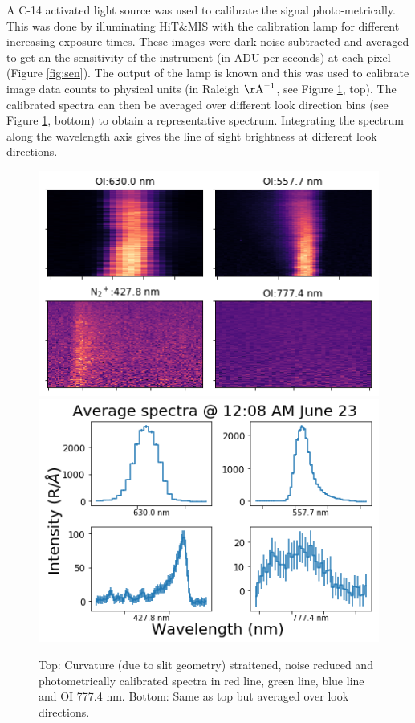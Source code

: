 \documentclass[crop=false,class=mitthesis,oneside,font=12pt]{standalone}
\begin{document}
A C-14 activated light source was used to calibrate the signal photo-metrically. This was done by illuminating HiT\&MIS with the calibration lamp for different increasing exposure times. These images were dark noise subtracted and averaged to get an the sensitivity of the instrument (in ADU per seconds) at each pixel (Figure \ref{fig:sen}). The output of the lamp is known and this was used to calibrate image data counts to physical units (in Raleigh $\rm {\AA}^{-1}$, see Figure \ref{fig:calib}, top). The calibrated spectra can then be averaged over different look direction bins (see Figure \ref{fig:calib}, bottom) to obtain a representative spectrum. Integrating the spectrum along the wavelength axis gives the line of sight brightness at different look directions. 
\begin{figure}[H]
	\centering\includegraphics[width=30pc]{feature_img.png}
    \centering\includegraphics[width=30pc]{feature_spectra.png}
	\caption{Top: Curvature (due to slit geometry) straitened, noise reduced and photometrically calibrated spectra in red line, green line, blue line and OI 777.4 nm. Bottom: Same as top but averaged over look directions.}
	\label{fig:calib}
\end{figure}
\end{document}
